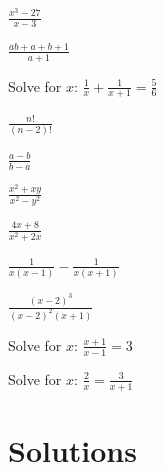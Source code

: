 \begin{problems}
  \item $\displaystyle\frac{x^{3}-27}{x-3}$
  \item $\displaystyle\frac{ab+a+b+1}{a+1}$
  \item Solve for $x$: $\displaystyle\frac{1}{x}+\frac{1}{x+1}=\frac{5}{6}$
  \item $\displaystyle\frac{n!}{(n-2)!}$
  \item $\displaystyle\frac{a-b}{b-a}$
  \item $\displaystyle\frac{x^{2}+xy}{x^{2}-y^{2}}$
  \item $\displaystyle\frac{4x+8}{x^{2}+2x}$
  \item $\displaystyle\frac{1}{x(x-1)}-\frac{1}{x(x+1)}$
  \item $\displaystyle\frac{(x-2)^{3}}{(x-2)^{2}(x+1)}$
  \item Solve for $x$: $\displaystyle\frac{x+1}{x-1}=3$
  \item Solve for $x$: $\displaystyle\frac{2}{x}=\frac{3}{x+1}$
\end{problems}

\section{Solutions}

